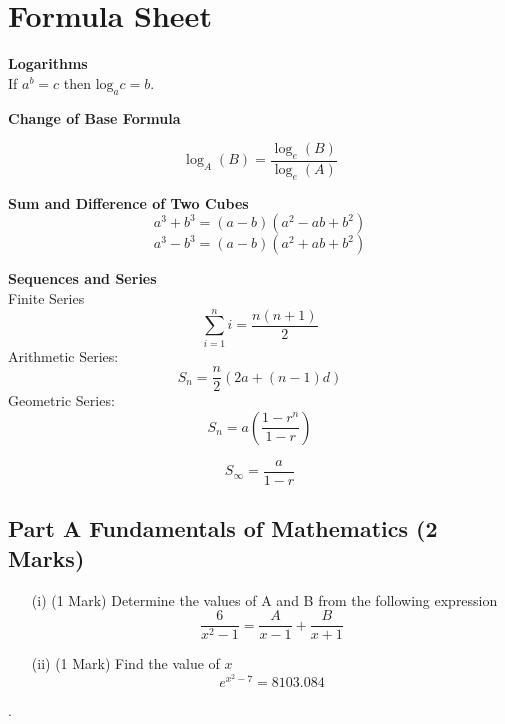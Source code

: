 \documentclass[11pt]{article} %
\begin{document}

\newpage


\LARGE
\section*{Formula Sheet}

\noindent \textbf{Logarithms}\\
	If $a^b = c$ then $\mbox{log}_a c = b$.
	
\medskip

\noindent \textbf{Change of Base Formula}

\[ \log_A(B) = \frac{ \log_e(B) }{ \log_e(A) }  \]
\smallskip

\noindent \textbf{Sum and Difference of Two Cubes}
	\[ a^3 + b^3 = (a-b)(a^2 - ab + b^2)\]
	\[ a^3 - b^3 = (a-b)(a^2 + ab + b^2)\]
	\medskip
	
\noindent \textbf{Sequences and Series}\\
	Finite Series
	\[ \sum_{i=1}^{n} i = \frac{n(n+1)}{2}\]
	\medskip
	Arithmetic Series:
	\[ S_n = \frac{n}{2} \left(2a + (n-1) d \right)\]
	\medskip
	Geometric Series:
	\[ S_n = a\left(\frac{1-r^n}{1-r}\right)\]
	
	\[ S_\infty = \frac{a}{1-r}\]


	
	

\newpage

\subsection*{Part A Fundamentals of Mathematics (2 Marks) } %

\begin{itemize}
	
	\item[(i)] (1 Mark) Determine the values of A and B from the following expression
	\[  \frac{6}{x^2-1} = \frac{A}{x-1} + \frac{B}{x+1}\]
	\vspace{2.5cm}
	
%


		
	\item[(ii)] (1 Mark) Find the value of $x$
	{ \huge	\[e^{x^2-7} = 8103.084 \]
}
\end{itemize}
\newpage
.
\newpage
\end{document}
